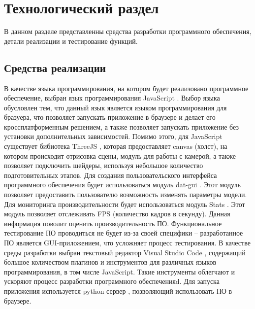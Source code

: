 \chapter{Технологический раздел}
\label{cha:impl}
В данном разделе представленны средства разработки программного обеспечения, детали реализации и тестирование функций.
\section{Средства реализации}
В качестве языка программирования, на котором будет реализовано программное обеспечение, выбран язык программирования JavaScript \cite{impl:js}. Выбор языка обусловлен тем, что данный язык является языком программирования для бразуера,
что позволяет запускать приложение в браузере и делает его кроссплатформенным решением, а также позволяет запускать приложение без установки дополнительных зависимостей. Помимо этого, для JavaScript существует бибиотека 
ThreeJS \cite{impl:three_js}, которая предоставляет canvas (холст), на котором происходит отрисовка сцены, модуль для работы с камерой, а также позволяет подключить шейдеры, используя небольшое количество подготовительных этапов.
Для создания пользовательского интерфейса программного обеспечения будет использоваться модуль dat-gui \cite{impl:dat_gui}. Этот модуль позволяет предоставить пользователю возможность изменять параметры модели.
Для мониторинга производительности будет использоваться модуль Stats \cite{impl:stats_js}. Этот модуль позволяет отслеживать FPS (количество кадров в секунду). Данная информация поволит оценить производительность ПО.
Функциональное тестирование ПО проводиться не будет из-за своей специфики -- разработанное ПО является GUI-приложением, что усложняет процесс тестирования.
В качестве среды разработки выбран текстовый редактор Visual Studio Code \cite{impl:vscode}, содержащий большое количеством плагинов и инструментов для различных языков программирования, в том числе JavaScript. Такие инструменты облегчают и ускоряют процесс разработки программного обеспеченияd.
Для запуска приложения используется python сервер \cite{impl:python}, позволяющий использовать ПО в браузере.  

